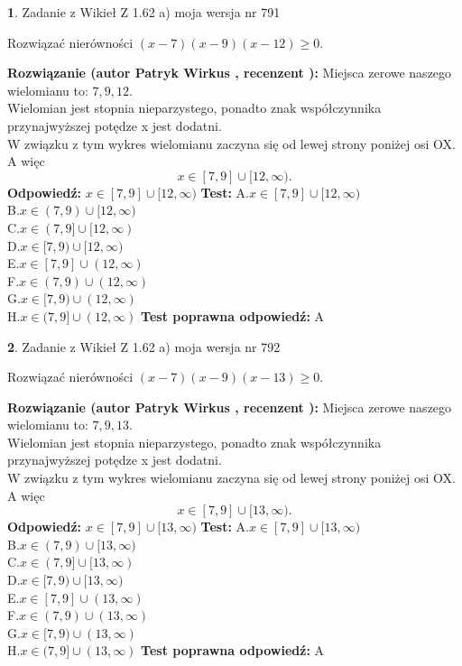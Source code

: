\documentclass[12pt, a4paper]{article}
\theoremstyle{definition} %
\newtheorem{zad}{}
\newcommand{\zadStart}[1]{\begin{zad}#1\newline}
\newcommand{\zadStop}{\end{zad}}
\newcommand{\rozwStart}[2]{\noindent \textbf{Rozwiązanie (autor #1 , recenzent #2): }\newline}
\newcommand{\rozwStop}{\newline}
\newcommand{\odpStart}{\noindent \textbf{Odpowiedź:}\newline}
\newcommand{\odpStop}{\newline}
\newcommand{\testStart}{\noindent \textbf{Test:}\newline}
\newcommand{\testStop}{\newline}
\newcommand{\kluczStart}{\noindent \textbf{Test poprawna odpowiedź:}\newline}
\newcommand{\kluczStop}{\newline}
\begin{document}
\zadStart{Zadanie z Wikieł Z 1.62 a) moja wersja nr 791}

Rozwiązać nierówności $(x-7)(x-9)(x-12)\ge0$.
\zadStop
\rozwStart{Patryk Wirkus}{}
Miejsca zerowe naszego wielomianu to: $7, 9, 12$.\\
Wielomian jest stopnia nieparzystego, ponadto znak współczynnika przy\linebreak najwyższej potędze x jest dodatni.\\ W związku z tym wykres wielomianu zaczyna się od lewej strony poniżej osi OX. A więc $$x \in [7,9] \cup [12,\infty).$$
\rozwStop
\odpStart
$x \in [7,9] \cup [12,\infty)$
\odpStop
\testStart
A.$x \in [7,9] \cup [12,\infty)$\\
B.$x \in (7,9) \cup [12,\infty)$\\
C.$x \in (7,9] \cup [12,\infty)$\\
D.$x \in [7,9) \cup [12,\infty)$\\
E.$x \in [7,9] \cup (12,\infty)$\\
F.$x \in (7,9) \cup (12,\infty)$\\
G.$x \in [7,9) \cup (12,\infty)$\\
H.$x \in (7,9] \cup (12,\infty)$
\testStop
\kluczStart
A
\kluczStop



\zadStart{Zadanie z Wikieł Z 1.62 a) moja wersja nr 792}

Rozwiązać nierówności $(x-7)(x-9)(x-13)\ge0$.
\zadStop
\rozwStart{Patryk Wirkus}{}
Miejsca zerowe naszego wielomianu to: $7, 9, 13$.\\
Wielomian jest stopnia nieparzystego, ponadto znak współczynnika przy\linebreak najwyższej potędze x jest dodatni.\\ W związku z tym wykres wielomianu zaczyna się od lewej strony poniżej osi OX. A więc $$x \in [7,9] \cup [13,\infty).$$
\rozwStop
\odpStart
$x \in [7,9] \cup [13,\infty)$
\odpStop
\testStart
A.$x \in [7,9] \cup [13,\infty)$\\
B.$x \in (7,9) \cup [13,\infty)$\\
C.$x \in (7,9] \cup [13,\infty)$\\
D.$x \in [7,9) \cup [13,\infty)$\\
E.$x \in [7,9] \cup (13,\infty)$\\
F.$x \in (7,9) \cup (13,\infty)$\\
G.$x \in [7,9) \cup (13,\infty)$\\
H.$x \in (7,9] \cup (13,\infty)$
\testStop
\kluczStart
A
\kluczStop
\end{document}
